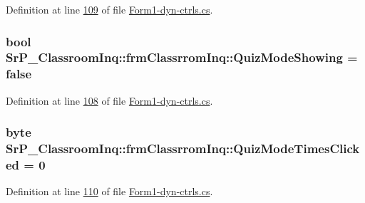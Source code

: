 \-Definition at line \hyperlink{_form1-dyn-ctrls_8cs_source_l00109}{109} of file \hyperlink{_form1-dyn-ctrls_8cs_source}{\-Form1-\/dyn-\/ctrls.\-cs}.

\hypertarget{class_sr_p___classroom_inq_1_1frm_classrrom_inq_a2be9d2ea6cc1cabf0dc6c6f3ee2544ce}{
\subsubsection[{\-Quiz\-Mode\-Showing}]{\setlength{\rightskip}{0pt plus 5cm}bool {\bf \-Sr\-P\-\_\-\-Classroom\-Inq\-::frm\-Classrrom\-Inq\-::\-Quiz\-Mode\-Showing} = false}}
\label{class_sr_p___classroom_inq_1_1frm_classrrom_inq_a2be9d2ea6cc1cabf0dc6c6f3ee2544ce}


\-Definition at line \hyperlink{_form1-dyn-ctrls_8cs_source_l00108}{108} of file \hyperlink{_form1-dyn-ctrls_8cs_source}{\-Form1-\/dyn-\/ctrls.\-cs}.

\hypertarget{class_sr_p___classroom_inq_1_1frm_classrrom_inq_a0c88b881dc5ae86b5b3d5e04434b2ea8}{
\subsubsection[{\-Quiz\-Mode\-Times\-Clicked}]{\setlength{\rightskip}{0pt plus 5cm}byte {\bf \-Sr\-P\-\_\-\-Classroom\-Inq\-::frm\-Classrrom\-Inq\-::\-Quiz\-Mode\-Times\-Clicked} = 0}}
\label{class_sr_p___classroom_inq_1_1frm_classrrom_inq_a0c88b881dc5ae86b5b3d5e04434b2ea8}


\-Definition at line \hyperlink{_form1-dyn-ctrls_8cs_source_l00110}{110} of file \hyperlink{_form1-dyn-ctrls_8cs_source}{\-Form1-\/dyn-\/ctrls.\-cs}.

